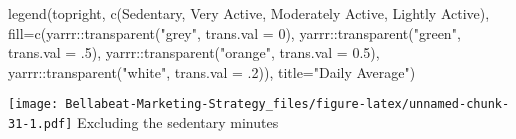 \documentclass[
]{article}
\newenvironment{Shaded}{\begin{snugshade}}{\end{snugshade}}
\newcommand{\AttributeTok}[1]{\textcolor[rgb]{0.77,0.63,0.00}{#1}}
\newcommand{\DecValTok}[1]{\textcolor[rgb]{0.00,0.00,0.81}{#1}}
\newcommand{\FloatTok}[1]{\textcolor[rgb]{0.00,0.00,0.81}{#1}}
\newcommand{\FunctionTok}[1]{\textcolor[rgb]{0.00,0.00,0.00}{#1}}
\newcommand{\NormalTok}[1]{#1}
\newcommand{\SpecialCharTok}[1]{\textcolor[rgb]{0.00,0.00,0.00}{#1}}
\newcommand{\StringTok}[1]{\textcolor[rgb]{0.31,0.60,0.02}{#1}}
\begin{document}
\begin{Shaded}
\begin{Highlighting}[]
\FunctionTok{legend}\NormalTok{(}\StringTok{\textquotesingle{}topright\textquotesingle{}}\NormalTok{, }\FunctionTok{c}\NormalTok{(}\StringTok{\textquotesingle{}Sedentary\textquotesingle{}}\NormalTok{, }\StringTok{\textquotesingle{}Very Active\textquotesingle{}}\NormalTok{, }\StringTok{\textquotesingle{}Moderately Active\textquotesingle{}}\NormalTok{, }\StringTok{\textquotesingle{}Lightly Active\textquotesingle{}}\NormalTok{), }\AttributeTok{fill=}\FunctionTok{c}\NormalTok{(yarrr}\SpecialCharTok{::}\FunctionTok{transparent}\NormalTok{(}\StringTok{"grey"}\NormalTok{, }\AttributeTok{trans.val =} \DecValTok{0}\NormalTok{), yarrr}\SpecialCharTok{::}\FunctionTok{transparent}\NormalTok{(}\StringTok{"green"}\NormalTok{, }\AttributeTok{trans.val =}\NormalTok{ .}\DecValTok{5}\NormalTok{), yarrr}\SpecialCharTok{::}\FunctionTok{transparent}\NormalTok{(}\StringTok{"orange"}\NormalTok{, }\AttributeTok{trans.val =} \FloatTok{0.5}\NormalTok{), yarrr}\SpecialCharTok{::}\FunctionTok{transparent}\NormalTok{(}\StringTok{"white"}\NormalTok{, }\AttributeTok{trans.val =}\NormalTok{ .}\DecValTok{2}\NormalTok{)), }\AttributeTok{title=}\StringTok{"Daily Average"}\NormalTok{)}
\end{Highlighting}
\end{Shaded}

\texttt{[image: Bellabeat-Marketing-Strategy\_files/figure-latex/unnamed-chunk-31-1.pdf]}
Excluding the sedentary minutes
\end{document}
